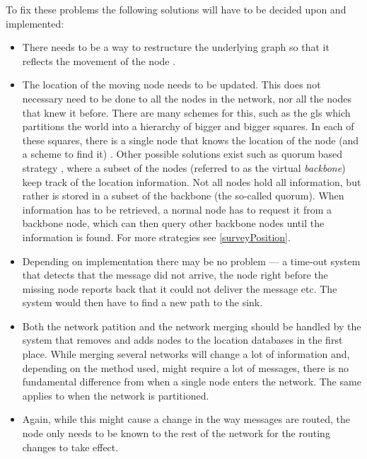 To fix these problems the following solutions will have to be decided upon and implemented:
\begin{itemize}
\item There needs to be a way to restructure the underlying graph so that it reflects the movement of the node \cite{practical}.
\item The location of the moving node needs to be updated. This does not necessary need to be done to all the nodes in the network, nor all the nodes that knew it before. There are many schemes for this, such as the \ac{gls} \cite{scaleLocation} which partitions the world into a hierarchy of bigger and bigger squares. In each of these squares, there is a single node that knows the location of the node (and a scheme to find it) \cite{scaleLocation}. Other possible solutions exist such as quorum based strategy \cite{quorum_basic}, where a subset of the nodes (referred to as the virtual \emph{backbone}) keep track of the location information. Not all nodes hold all information, but rather is stored in a subset of the backbone (the so-called quorum). When information has to be retrieved, a normal node has to request it from a backbone node, which can then query other backbone nodes until the information is found. For more strategies see \ref{surveyPosition}.
\item Depending on implementation there may be no problem --- a time-out system that detects that the message did not arrive, the node right before the missing node reports back that it could not deliver the message etc. The system would then have to find a new path to the sink.
\item Both the network patition and the network merging should be handled by the system that removes and adds nodes to the location databases in the first place. While merging several networks will change a lot of information and, depending on the method used, might require a lot of messages, there is no fundamental difference from when a single node enters the network. The same applies to when the network is partitioned. 
\item Again, while this might cause a change in the way messages are routed, the node only needs to be known to the rest of the network for the routing changes to take effect. 
\end{itemize}
